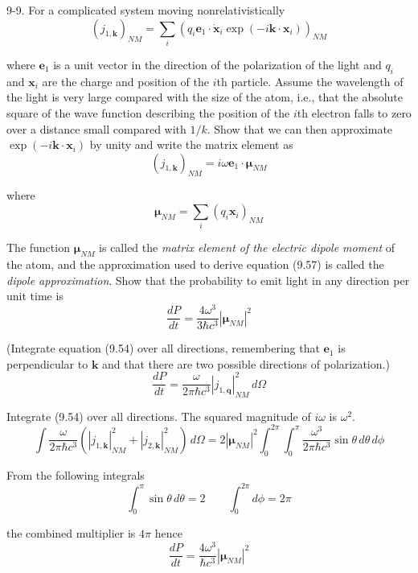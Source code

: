 \documentclass[12pt]{article}
\begin{document}
9-9.
For a complicated system moving nonrelativistically
\begin{equation*}
(j_{1,\mathbf k})_{NM}=\sum_i\left(
q_i\mathbf e_1\cdot\dot{\mathbf x}_i
\exp(-i\mathbf k\cdot\mathbf x_i)\right)_{NM}
\end{equation*}

where $\mathbf e_1$ is a unit vector in the direction of the
polarization of the light and $q_i$ and $\mathbf x_i$ are the
charge and position of the $i$th particle.
Assume the wavelength of the light is very large compared with the
size of the atom, i.e., that the absolute square of the wave function
describing the position of the $i$th electron falls to zero over a
distance small compared with $1/k$.
Show that we can then approximate $\exp(-i\mathbf k\cdot\mathbf x_i)$
by unity and write the matrix element as
\begin{equation*}
(j_{1,\mathbf k})_{NM}=i\omega\mathbf e_1\cdot\boldsymbol\mu_{NM}
\tag{9.57}
\end{equation*}

where
\begin{equation*}
\boldsymbol\mu_{NM}=\sum_i(q_i\mathbf x_i)_{NM}
\tag{9.58}
\end{equation*}

The function $\boldsymbol\mu_{NM}$ is called the
{\it matrix element of the electric dipole moment}
of the atom, and the approximation used to derive equation (9.57)
is called the {\it dipole approximation}.
Show that the probability to emit light in any direction per unit time is
\begin{equation*}
\frac{dP}{dt}=\frac{4\omega^3}{3\hbar c^3}\left|\boldsymbol\mu_{NM}\right|^2
\tag{9.59}
\end{equation*}

(Integrate equation (9.54) over all directions, remembering that
$\mathbf e_1$ is perpendicular to $\mathbf k$ and that there are two
possible directions of polarization.)
\begin{equation*}
\frac{dP}{dt}=\frac{\omega}{2\pi\hbar c^3}\left|j_{1,\mathbf q}\right|_{NM}^2
\,d\Omega
\tag{9.54}
\end{equation*}

Integrate (9.54) over all directions.
The squared magnitude of $i\omega$ is $\omega^2$.
\begin{equation*}
\int\frac{\omega}{2\pi\hbar c^3}
\left(\left|j_{1,\mathbf k}\right|_{NM}^2+\left|j_{2,\mathbf k}\right|_{NM}^2\right)
\,d\Omega
=2\left|\boldsymbol\mu_{NM}\right|^2
\int_0^{2\pi}\int_0^\pi
\frac{\omega^3}{2\pi\hbar c^3}
\sin\theta
\,d\theta\,d\phi
\end{equation*}

From the following integrals
\begin{equation*}
\int_0^\pi\sin\theta\,d\theta=2
\qquad
\int_0^{2\pi}d\phi=2\pi
\end{equation*}

the combined multiplier is $4\pi$ hence
\begin{equation*}
\frac{dP}{dt}
=\frac{4\omega^3}{\hbar c^3}
\left|\boldsymbol\mu_{NM}\right|^2
\end{equation*}

\end{document}
